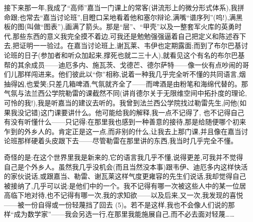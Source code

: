 接下来那一年,我成了“高师”嘉当一门课上的常客(讲流形上的微分形式体系),我拼命跟;也常去“嘉当讨论班”,目瞪口呆地看着他和塞尔辩论,满嘴“谱序列”(呜!),满黑板的图(叫做“图表”),画满了箭头。那是“层”、“甲壳”以及一整套军火库的英勇时代,那些东西的意义我完全摸不着边,可我还是勉勉强强逼着自己把定义和陈述吞下去,把证明一一验过。在嘉当讨论班上,谢瓦莱、韦伊也定期露面;而到了布尔巴基讨论班的日子(参加者和听众加起来,撑死也就二三十人),就看见这个有名的布尔巴基帮的其余成员——迪厄多内、施瓦茨、戈德芒、德尔萨特——像一伙有点吵闹的哥们儿那样闯进来。他们彼此以“你”相称,说着一种我几乎完全听不懂的共同语言,烟抽得凶,也爱笑;只差几箱啤酒,气氛就齐全了——而啤酒是由粉笔和海绵代替的。那气氛与法兰西公学院勒雷的课截然不同(讲肖德尔关于无限维空间中拓扑度的理论,可怜的我!),我是听嘉当的建议去听的。我曾到法兰西公学院找过勒雷先生,问他(如果我没记错)这门课要讲什么。他可能给我的解释,我一点不记得了,
 也不记得自己有没有听懂什么——只记得:在那里我也感到一种善意的接待,那是给随便哪个初来乍到的外乡人的。肯定正是这一点,而非别的什么,让我去上那门课,并且像在嘉当讨论班那样硬着头皮跟下去——尽管勒雷在那里讲的东西,我当时几乎完全不懂。

奇怪的是:在这个世界里我是新来的,它的语言我几乎不懂,说得更差,可我并不觉得自己是个外乡人。虽然我几乎没机会(而且当然没本事)跟韦伊、迪厄多内这样快活的家伙说话,或跟嘉当、勒雷、谢瓦莱这样气度更雍容的先生们说话,我却觉得自己被接纳了,几乎可以说:是他们中的一个。我不记得有哪一次被这些人中的某一位居高临下地对待,也不记得有哪一次,我的求知欲——以及后来,又一次,我发现的喜悦——被一份自得或一份轻蔑挡了回去 (5)。若不是这样,我也不会像人们说的那样“成为数学家”——我会另选一行,在那里我能施展自己,而不必去面对轻蔑……

